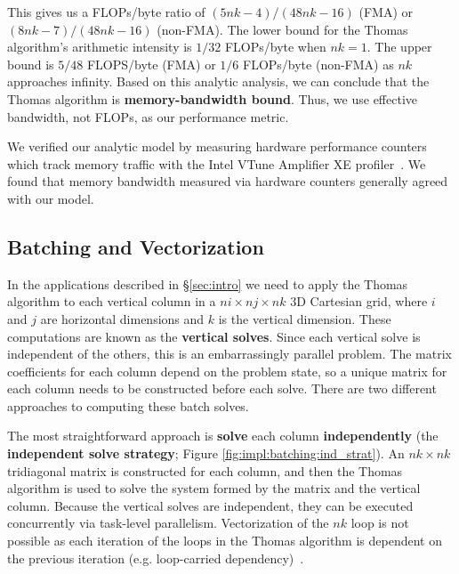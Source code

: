 \documentclass{sig-alternate}
\begin{document}
This gives us a FLOPs/byte ratio of \((5nk-4)/(48nk-16)\) (FMA) or
  \((8nk-7)/(48nk-16)\) (non-FMA).
The lower bound for the Thomas algorithm's arithmetic intensity is \(1/32\)
  FLOPs/byte when \(nk=1\). 
The upper bound is \(5/48\) FLOPS/byte (FMA) or \(1/6\) FLOPs/byte (non-FMA) as
  \(nk\) approaches infinity.
Based on this analytic analysis, we can conclude that the Thomas algorithm is
  \textbf{memory-bandwidth bound}.
Thus, we use effective bandwidth, not FLOPs, as our performance metric.

We verified our analytic model by measuring hardware performance counters which
  track memory traffic with the Intel VTune Amplifier XE
  profiler~\cite{intel_vtune_amplifier}.
We found that memory bandwidth measured via hardware counters generally agreed
  with our model. 

\subsection{Batching and Vectorization}
\label{sec:impl:batching_and_parallelism}

In the applications described in \S\ref{sec:intro} we need to apply the
  Thomas algorithm to each vertical column in a \(ni \times nj \times nk\)
  3D Cartesian grid, where \(i\) and \(j\) are horizontal dimensions and \(k\) is
  the vertical dimension.
These computations are known as the \textbf{vertical solves}.
Since each vertical solve is independent of the others, this is an
  embarrassingly parallel problem.
The matrix coefficients for each column depend on the problem state, so a
  unique matrix for each column needs to be constructed before each solve.
There are two different approaches to computing these batch solves.

The most straightforward approach is \textbf{solve} each column
  \textbf{independently} (the \textbf{independent solve strategy}; Figure
  \ref{fig:impl:batching:ind_strat}).
An \(nk \times nk\) tridiagonal matrix is constructed for each column, and then
  the Thomas algorithm is used to solve the system formed by the matrix and the
  vertical column.
Because the vertical solves are independent, they can be executed concurrently
  via task-level parallelism.
Vectorization of the \(nk\) loop is not possible as each iteration of the loops
  in the Thomas algorithm is dependent on the previous iteration (e.g.
  loop-carried dependency)~\cite{pipelined_thomas_algorithm}.
\end{document}
